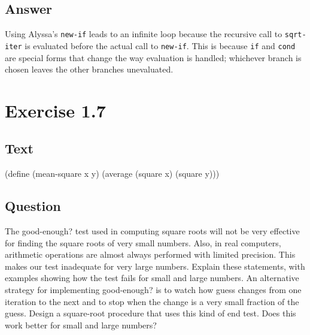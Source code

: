 \documentclass[
]{article}
\newenvironment{Shaded}{}{}
\newcommand{\ExtensionTok}[1]{#1}
\newcommand{\FunctionTok}[1]{\textcolor[rgb]{0.02,0.16,0.49}{#1}}
\newcommand{\NormalTok}[1]{#1}
\begin{document}
\hypertarget{answer-5}{%
\subsection{Answer}\label{answer-5}}

Using Alyssa's \texttt{new-if} leads to an infinite loop because the
recursive call to \texttt{sqrt-iter} is evaluated before the actual call
to \texttt{new-if}. This is because \texttt{if} and \texttt{cond} are
special forms that change the way evaluation is handled; whichever
branch is chosen leaves the other branches unevaluated.

\hypertarget{exercise-1.7}{%
\section{Exercise 1.7}\label{exercise-1.7}}

\hypertarget{text-1}{%
\subsection{Text}\label{text-1}}

\hypertarget{mean-square}{%
\label{mean-square}}%
\begin{Shaded}
\begin{Highlighting}[numbers=left,,]
\NormalTok{(}\ExtensionTok{define}\FunctionTok{ }\NormalTok{(mean{-}square x y)}
\NormalTok{  (average (square x) (square y)))}
\end{Highlighting}
\end{Shaded}

\hypertarget{question-6}{%
\subsection{Question}\label{question-6}}

The good-enough? test used in computing square roots will not be very
effective for finding the square roots of very small numbers. Also, in
real computers, arithmetic operations are almost always performed with
limited precision. This makes our test inadequate for very large
numbers. Explain these statements, with examples showing how the test
fails for small and large numbers. An alternative strategy for
implementing good-enough? is to watch how guess changes from one
iteration to the next and to stop when the change is a very small
fraction of the guess. Design a square-root procedure that uses this
kind of end test. Does this work better for small and large numbers?
\end{document}
